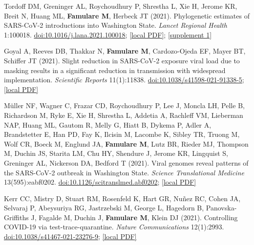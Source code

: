 \documentclass{article}
\begin{document}
\begin{llist}
\begin{items}
\item[{[23]}] Tordoff DM, Greninger AL, Roychoudhury P, Shrestha L, Xie H, Jerome KR, Breit N, Huang ML, \textbf{Famulare M}, Herbeck JT (2021). Phylogenetic estimates of SARS-CoV-2 introductions into Washington State. \emph{Lancet Regional Health} 1:100018. \href{https://doi.org/10.1016/j.lana.2021.100018}{doi:10.1016/j.lana.2021.100018}; \href{https://famulare.github.io/assets/publication-mirror/journal-23.pdf}{[local PDF]}; \href{https://famulare.github.io/assets/publication-mirror/supplements/journal-articles-23-mmc1.xlsx}{[supplement 1]}

\item[{[22]}] Goyal A, Reeves DB, Thakkar N, \textbf{Famulare M}, Cardozo-Ojeda EF, Mayer BT, Schiffer JT (2021). Slight reduction in SARS-CoV-2 exposure viral load due to masking results in a significant reduction in transmission with widespread implementation. \emph{Scientific Reports} 11(1):11838. \href{https://doi.org/10.1038/s41598-021-91338-5}{doi:10.1038/s41598-021-91338-5}; \href{https://famulare.github.io/assets/publication-mirror/journal-22.pdf}{[local PDF]}

\item[{[21]}] M\"uller NF, Wagner C, Frazar CD, Roychoudhury P, Lee J, Moncla LH, Pelle B, Richardson M, Ryke E, Xie H, Shrestha L, Addetia A, Rachleff VM, Lieberman NAP, Huang ML, Gautom R, Melly G, Hiatt B, Dykema P, Adler A, Brandstetter E, Han PD, Fay K, Ilcisin M, Lacombe K, Sibley TR, Truong M, Wolf CR, Boeck M, Englund JA, \textbf{Famulare M}, Lutz BR, Rieder MJ, Thompson M, Duchin JS, Starita LM, Chu HY, Shendure J, Jerome KR, Lingquist S, Greninger AL, Nickerson DA, Bedford T (2021). Viral genomes reveal patterns of the SARS-CoV-2 outbreak in Washington State. \emph{Science Translational Medicine} 13(595):eabf0202. \href{https://doi.org/10.1126/scitranslmed.abf0202}{doi:10.1126/scitranslmed.abf0202}; \href{https://famulare.github.io/assets/publication-mirror/journal-21.pdf}{[local PDF]}

\item[{[20]}] Kerr CC, Mistry D, Stuart RM, Rosenfeld K, Hart GR, Nu\~nez RC, Cohen JA, Selvaraj P, Abeysuriya RG, Jastrzebski M, George L, Hagedorn B, Panovska-Griffiths J, Fagalde M, Duchin J, \textbf{Famulare M}, Klein DJ (2021). Controlling COVID-19 via test-trace-quarantine. \emph{Nature Communications} 12(1):2993. \href{https://doi.org/10.1038/s41467-021-23276-9}{doi:10.1038/s41467-021-23276-9}; \href{https://famulare.github.io/assets/publication-mirror/journal-20.pdf}{[local PDF]}


\end{items}
\end{llist}
\end{document}
